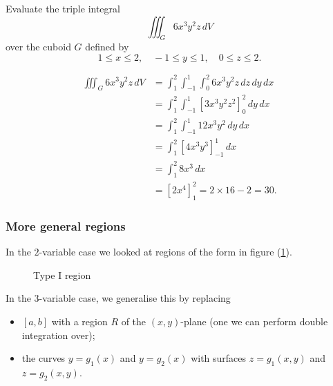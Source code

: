   \begin{example}
    Evaluate the triple integral
      \[
        \iiint_G 6x^3y^2z \, dV
      \]
    over the cuboid $G$ defined by
      \[
        1 \leq x \leq 2, \quad -1 \leq y \leq 1, \quad 0 \leq z \leq 2.
      \]

      \begin{align*}
        \iiint_G 6x^3y^2z \, dV & = \int_1^2 \int_{-1}^1 \int_0^2 6x^3y^2z \, dz \, dy \, dx  \\
        & = \int_1^2 \int_{-1}^1 \left[3x^3y^2z^2\right]_0^2 \, dy \, dx  \\
        & = \int_1^2 \int_{-1}^1 12x^3y^2 \, dy \, dx  \\
        & = \int_1^2 \left[4x^3y^3\right]_{-1}^1 \, dx  \\
        & = \int_1^2 8x^3 \, dx  \\
        & = \left[2x^4\right]_1^2 = 2 \times 16 - 2 = 30.
      \end{align*}
  \end{example}

  \subsubsection*{More general regions}

  In the $2$-variable case we looked at regions of the form in figure (\ref{typeiregion2}).
  \begin{figure}[H]
    \centering
    \def\svgwidth{0.45\columnwidth}
    
    \caption{Type I region}
    \label{typeiregion2}
  \end{figure}

  In the $3$-variable case, we generalise this by replacing
    \begin{itemize}
      \item $[a, b]$ with a region $R$ of the $(x, y)$-plane (one we can perform double integration over);
      \item the curves $y = g_1(x)$ and $y=g_2(x)$ with surfaces $z = g_1(x, y)$ and $z = g_2(x, y)$.
    \end{itemize}

